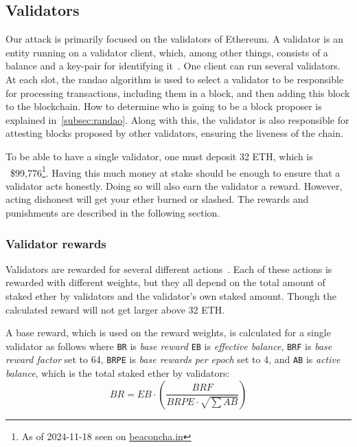 \subsection{Validators}\label{subsec:validator}
Our attack is primarily focused on the validators of Ethereum.
A validator is an entity running on a validator client,
which, among other things, consists of a balance and a key-pair for identifying it~\cite{Staking}.
One client can run several validators.
At each slot, the \gls{randao} algorithm is used to select a validator to be responsible for processing transactions,
including them in a block,
and then adding this block to the blockchain.
How to determine who is going to be a block proposer is explained in~\autoref{subsec:randao}.
Along with this, the validator is also responsible for attesting blocks proposed by other validators,
ensuring the liveness of the chain.

To be able to have a single validator, one must deposit 32 ETH,
which is ~\$99,776\footnote{As of 2024-11-18 seen on \href{https://beaconcha.in/}{beaconcha.in}}.
Having this much money at stake should be enough to ensure that a validator acts honestly.
Doing so will also earn the validator a reward.
However, acting dishonest will get your ether burned or slashed.
The rewards and punishments are described in the following section.
\subsubsection{Validator rewards}\label{subsubsec:valrewards}
Validators are rewarded for several different actions~\cite{PoSRewAndPen}.
Each of these actions is rewarded with different weights,
but they all depend on the total amount of staked ether by validators and the validator's own staked amount.
Though the calculated reward will not get larger above 32 ETH\@.

A base reward, which is used on the reward weights, is calculated for a single validator as follows where \texttt{BR} is \textit{base reward} \texttt{EB} is \textit{effective balance}, \texttt{BRF} is \textit{base reward factor} set to 64,
\texttt{BRPE} is \textit{base rewards per epoch} set to 4,
and \texttt{AB} is \textit{active balance}, which is the total staked ether by validators:
\begin{equation}
    BR = EB\cdot(\frac{BRF}{BRPE\cdot \sqrt{\sum{AB}}})
    \label{eq:basereward}
\end{equation}


